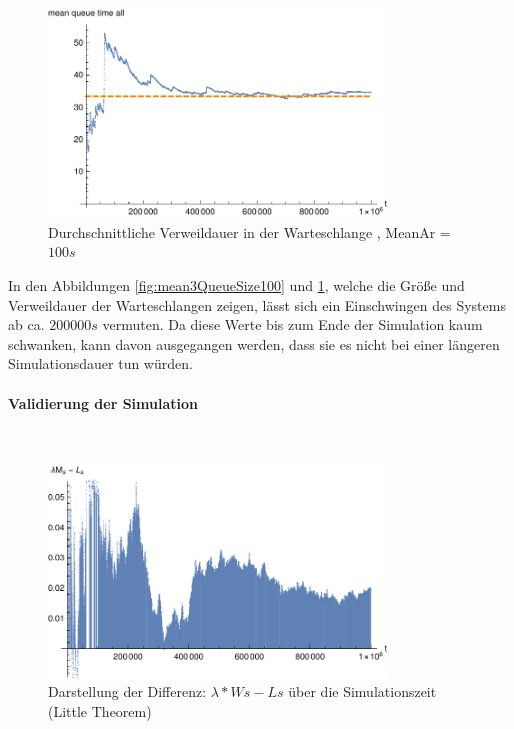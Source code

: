 \begin{figure}[htpb]
	\centering
	\includegraphics[width=0.8\textwidth]{abbildungen/2_Phone_VIP/Arrival_100_Serve_100_dur_1000000_Skip_0/MeanQueueTimeAll.pdf}
	\caption{Durchschnittliche Verweildauer in der Warteschlange , MeanAr = $100s$}
	\label{fig:mean3QueueTime100}
\end{figure}

In den Abbildungen \ref{fig:mean3QueueSize100} und \ref{fig:mean3QueueTime100}, welche die Größe und Verweildauer der Warteschlangen zeigen, lässt sich ein Einschwingen des Systems ab ca. $200000s$ vermuten. Da diese Werte bis zum Ende der Simulation kaum schwanken, kann davon ausgegangen werden, dass sie es nicht bei einer längeren Simulationsdauer tun würden.

\paragraph{Validierung der Simulation}
\\
\begin{figure}[htpb]
	\centering
	\includegraphics[width=0.8\textwidth]{abbildungen/2_Phone_VIP/Arrival_100_Serve_100_dur_1000000_Skip_0/LittleSystem.pdf}
	\caption{Darstellung der Differenz: $\lambda * Ws - Ls$ über die Simulationszeit (Little Theorem)}
	\label{fig:Little3System100}
\end{figure}

